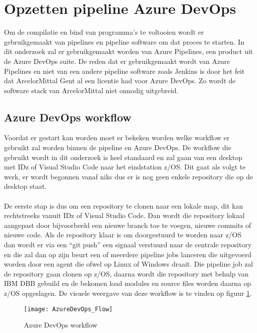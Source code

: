 \pagebreak

\section{Opzetten pipeline Azure DevOps}
Om de compilatie en bind van programma's te voltooien wordt er gebruikgemaakt van pipelines en pipeline software om dat proces te starten. In dit onderzoek zal er gebruikgemaakt worden van Azure Pipelines, een product uit de Azure DevOps suite. De reden dat er gebruikgemaakt wordt van Azure Pipelines en niet van een andere pipeline software zoals Jenkins is door het feit dat ArcelorMittal Gent al een licentie had voor Azure DevOps. Zo wordt de software stack van ArcelorMittal niet onnodig uitgebreid. 

\subsection{Azure DevOps workflow}
Voordat er gestart kan worden moet er bekeken worden welke workflow er gebruikt zal worden binnen de pipeline en Azure DevOps. De workflow die gebruikt wordt in dit onderzoek is heel standaard en zal gaan van een desktop met IDz of Visual Studio Code naar het eindstation z/OS. Dit gaat als volgt te werk, er wordt begonnen vanaf niks dus er is nog geen enkele repository die op de desktop staat. 
\\ \\
De eerste stap is dus om een repository te clonen naar een lokale map, dit kan rechtstreeks vanuit IDz of Visual Studio Code. Dan wordt die repository lokaal aangepast door bijvoorbeeld een nieuwe branch toe te voegen, nieuwe commits of nieuwe code. Als de repository klaar is om doorgestuurd te worden naar z/OS dan wordt er via een ``git push'' een signaal verstuurd naar de centrale repository en die zal dan op zijn beurt een of meerdere pipeline jobs lanceren die uitgevoerd worden door een agent die ofwel op Linux of Windows draait. Die pipeline job zal de repository gaan clonen op z/OS, daarna wordt die repository met behulp van IBM DBB gebuild en de bekomen load modules en source files worden daarna op z/OS opgeslagen. De visuele weergave van deze workflow is te vinden op figuur \ref{fig:azure devops flow}.
\begin{figure}[h]
    \centering
    \texttt{[image: AzureDevOps\_Flow]}
    \caption{Azure DevOps workflow}
    \label{fig:azure devops flow}
\end{figure}


